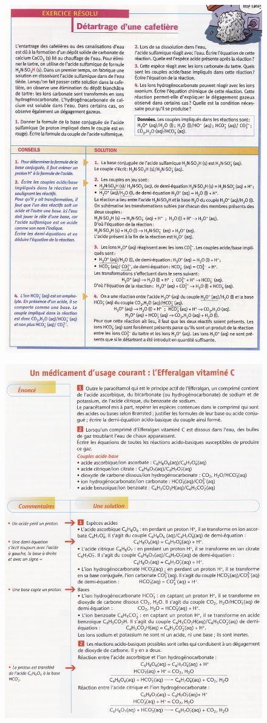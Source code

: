 \documentclass[11pt,a4paper]{article}
\begin{document}
\begin{figure}[h]
    \centering
    \includegraphics[width=\linewidth]{imgs/c3/xo3.jpg}
\end{figure}
\begin{figure}[h]
    \centering
    \includegraphics[width=\linewidth]{imgs/c3/xo4.jpg}
\end{figure}
\end{document}
